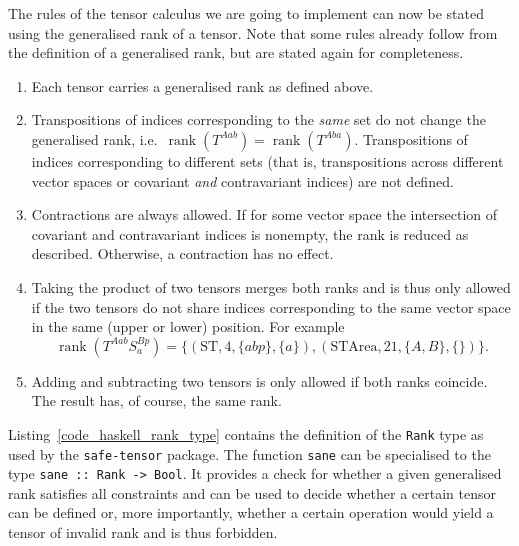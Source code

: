 The rules of the tensor calculus we are going to implement can now be stated using the generalised rank of a tensor. Note that some rules already follow from the definition of a generalised rank, but are stated again for completeness.
\begin{enumerate}
  \item Each tensor carries a generalised rank as defined above.
  \item Transpositions of indices corresponding to the \emph{same} set do not change the generalised rank, i.e.\ $\operatorname{rank}(T^{Aab}) = \operatorname{rank}(T^{Aba})$. Transpositions of indices corresponding to different sets (that is, transpositions across different vector spaces or covariant \emph{and} contravariant indices) are not defined.
  \item Contractions are always allowed. If for some vector space the intersection of covariant and contravariant indices is nonempty, the rank is reduced as described. Otherwise, a contraction has no effect.
  \item Taking the product of two tensors merges both ranks and is thus only allowed if the two tensors do not share indices corresponding to the same vector space in the same (upper or lower) position. For example
    \begin{equation}
      \operatorname{rank}(T^{Aab} S^{Bp}_{a}) = \{(\text{ST}, 4, \{abp\}, \{a\}), (\text{STArea}, 21, \{A,B\}, \{\})\}.
    \end{equation}
  \item Adding and subtracting two tensors is only allowed if both ranks coincide. The result has, of course, the same rank.
\end{enumerate}

Listing~\ref{code_haskell_rank_type} contains the definition of the \texttt{Rank} type as used by the \texttt{safe-tensor} package. The function \texttt{sane} can be specialised to the type \texttt{sane :: Rank -> Bool}. It provides a check for whether a given generalised rank satisfies all constraints and can be used to decide whether a certain tensor can be defined or, more importantly, whether a certain operation would yield a tensor of invalid rank and is thus forbidden.

